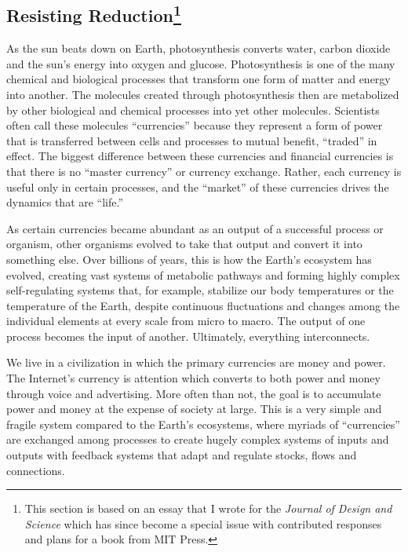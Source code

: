 \subsection[Resisting Reduction]{Resisting Reduction\footnote{This section is based on an essay that I wrote for the \emph{Journal of Design and Science} \cite{ito_resisting_2017} which has since become a special issue with contributed responses and plans for a book from MIT Press.}}
\label{intro:resisting}

As the sun beats down on Earth, photosynthesis converts water, carbon dioxide and the sun's energy into oxygen and glucose. Photosynthesis is one of the many chemical and biological processes that transform one form of matter and energy into another. The molecules created through photosynthesis then are metabolized by other biological and chemical processes into yet other molecules. Scientists often call these molecules ``currencies'' because they represent a form of power that is transferred between cells and processes to mutual benefit, ``traded'' in effect. The biggest difference between these currencies and financial currencies is that there is no ``master currency'' or currency exchange. Rather, each currency is useful only in certain processes, and the ``market'' of these currencies drives the dynamics that are ``life.''

As certain currencies became abundant as an output of a successful process or organism, other organisms evolved to take that output and convert it into something else. Over billions of years, this is how the Earth's ecosystem has evolved, creating vast systems of metabolic pathways and forming highly complex self-regulating systems that, for example, stabilize our body temperatures or the temperature of the Earth, despite continuous fluctuations and changes among the individual elements at every scale from micro to macro. The output of one process becomes the input of another. Ultimately, everything interconnects.

We live in a civilization in which the primary currencies are money and power. The Internet's currency is attention \cite{goldhaber1997attention} which converts to both power and money through voice and advertising. More often than not, the goal is to accumulate power and money at the expense of society at large. This is a very simple and fragile system compared to the Earth's ecosystems, where myriads of ``currencies'' are exchanged among processes to create hugely complex systems of inputs and outputs with feedback systems that adapt and regulate stocks, flows and connections.

